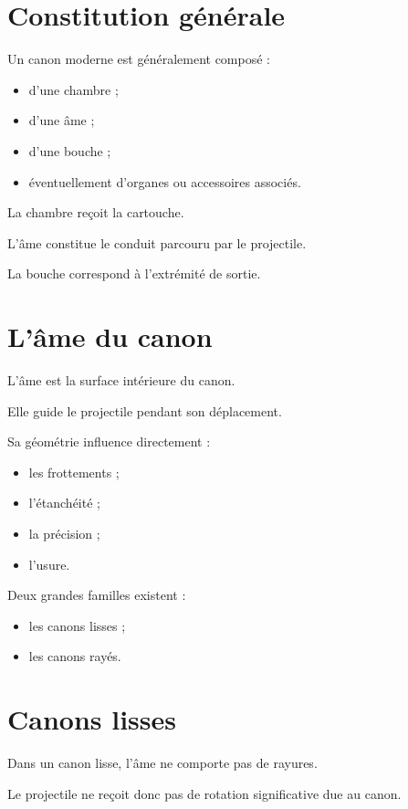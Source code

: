 \section{Constitution générale}

Un canon moderne est généralement composé :

\begin{itemize}
    \item d'une chambre ;
    \item d'une âme ;
    \item d'une bouche ;
    \item éventuellement d'organes ou accessoires associés.
\end{itemize}

La chambre reçoit la cartouche.

L'âme constitue le conduit parcouru par le projectile.

La bouche correspond à l'extrémité de sortie.

\section{L'âme du canon}

L'âme est la surface intérieure du canon.

Elle guide le projectile pendant son déplacement.

Sa géométrie influence directement :

\begin{itemize}
    \item les frottements ;
    \item l'étanchéité ;
    \item la précision ;
    \item l'usure.
\end{itemize}

Deux grandes familles existent :

\begin{itemize}
    \item les canons lisses ;
    \item les canons rayés.
\end{itemize}

\section{Canons lisses}

Dans un canon lisse, l'âme ne comporte pas de rayures.

Le projectile ne reçoit donc pas de rotation significative due au canon.

